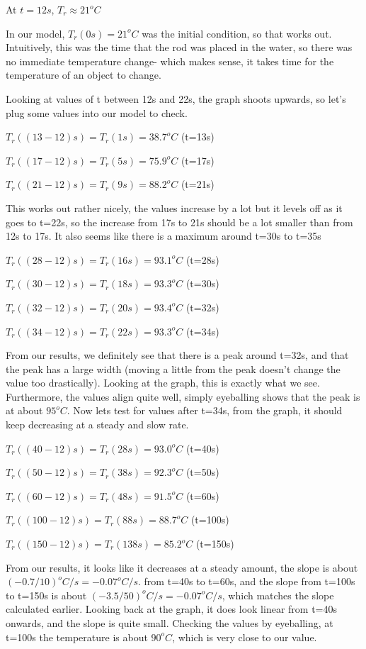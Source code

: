\documentclass{article}
\begin{document}
At $t=12s$, $T_r \approx 21^oC$

In our model, $T_r(0s) =21^oC$ was the initial condition, so that works out. Intuitively, this was the time that the rod was placed in the water, so there was no immediate temperature change- which makes sense, it takes time for the temperature of an object to change.

Looking at values of t between 12s and 22s, the graph shoots upwards, so let's plug some values into our model to check.

$T_r((13-12)s)=T_r(1s)= 38.7^oC$ (t=13s)

$T_r((17-12)s)=T_r(5s)= 75.9^oC$ (t=17s)

$T_r((21-12)s)= T_r(9s)=88.2^oC$ (t=21s)

This works out rather nicely, the values increase by a lot but it levels off as it goes to t=22s, so the increase from 17s to 21s should be a lot smaller than from 12s to 17s. It also seems like there is a maximum around t=30s to t=35s

$T_r((28-12)s)=T_r(16s)= 93.1^oC$ (t=28s)

$T_r((30-12)s)=T_r(18s)=93.3^oC$ (t=30s)

$T_r((32-12)s)=T_r(20s)= 93.4^oC$ (t=32s)

$T_r((34-12)s)=T_r(22s)= 93.3^oC$ (t=34s)

From our results, we definitely see that there is a peak around t=32s, and that the peak has a large width (moving a little from the peak doesn't change the value too drastically). Looking at the graph, this is exactly what we see. Furthermore, the values align quite well, simply eyeballing shows that the peak is at about $95^oC$. Now lets test for values after t=34s, from the graph, it should keep decreasing at a steady and slow rate.

$T_r((40-12)s)=T_r(28s)= 93.0^oC$ (t=40s)

$T_r((50-12)s)=T_r(38s)= 92.3^oC$ (t=50s)

$T_r((60-12)s)=T_r(48s)= 91.5^oC$ (t=60s)

$T_r((100-12)s)=T_r(88s)= 88.7^oC$ (t=100s)

$T_r((150-12)s)=T_r(138s)= 85.2^oC$ (t=150s)

From our results, it looks like it decreases at a steady amount, the slope is about $(-0.7/10)^oC/s = -0.07^oC/s$. from t=40s to t=60s, and the slope from t=100s to t=150s is about $(-3.5/50)^oC/s = -0.07^oC/s$, which matches the slope calculated earlier. Looking back at the graph, it does look linear from t=40s onwards, and the slope is quite small. Checking the values by eyeballing, at t=100s the temperature is about $90^oC$, which is very close to our value.
\end{document}
